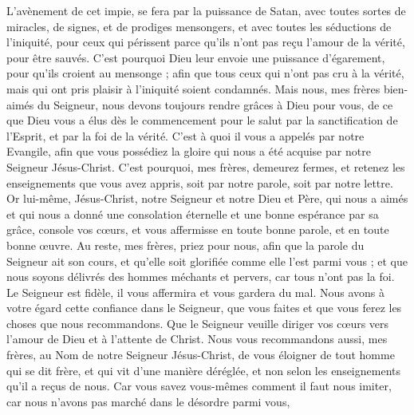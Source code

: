 \begin{multicols}{2}
L'avènement de cet impie, se fera par la puissance de Satan, avec toutes sortes de miracles, de signes, et de prodiges mensongers,
et avec toutes les séductions de l'iniquité, pour ceux qui périssent parce qu'ils n'ont pas reçu l'amour de la vérité, pour être sauvés.
C'est pourquoi Dieu leur envoie une puissance d'égarement, pour qu'ils croient au mensonge ;
afin que tous ceux qui n'ont pas cru à la vérité, mais qui ont pris plaisir à l'iniquité soient condamnés.
Mais nous, mes frères bien-aimés du Seigneur, nous devons toujours rendre grâces à Dieu pour vous, de ce que Dieu vous a élus dès le commencement pour le salut par la sanctification de l'Esprit, et par la foi de la vérité.
C'est à quoi il vous a appelés par notre Evangile, afin que vous possédiez la gloire qui nous a été acquise par notre Seigneur Jésus-Christ.
C'est pourquoi, mes frères, demeurez fermes, et retenez les enseignements que vous avez appris, soit par notre parole, soit par notre lettre.
Or lui-même, Jésus-Christ, notre Seigneur et notre Dieu et Père, qui nous a aimés et qui nous a donné une consolation éternelle et une bonne espérance par sa grâce,
console vos cœurs, et vous affermisse en toute bonne parole, et en toute bonne œuvre.
\VerseOne{}Au reste, mes frères, priez pour nous, afin que la parole du Seigneur ait son cours, et qu'elle soit glorifiée comme elle l'est parmi vous ;
et que nous soyons délivrés des hommes méchants et pervers, car tous n'ont pas la foi.
Le Seigneur est fidèle, il vous affermira et vous gardera du mal.
Nous avons à votre égard cette confiance dans le Seigneur, que vous faites et que vous ferez les choses que nous recommandons.
Que le Seigneur veuille diriger vos cœurs vers l'amour de Dieu et à l'attente de Christ.
Nous vous recommandons aussi, mes frères, au Nom de notre Seigneur Jésus-Christ, de vous éloigner de tout homme qui se dit frère, et qui vit d'une manière déréglée, et non selon les enseignements qu'il a reçus de nous.
Car vous savez vous-mêmes comment il faut nous imiter, car nous n'avons pas marché dans le désordre parmi vous,

\end{multicols}
